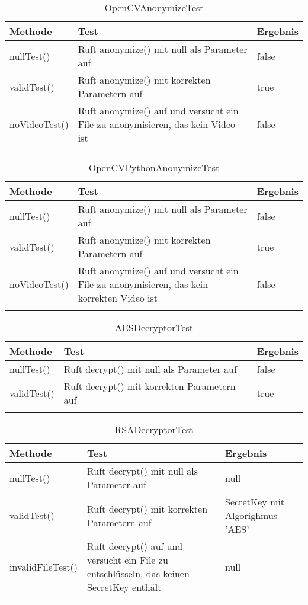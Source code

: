 \begin{longtable}{p{} | p{} | p{}}
\hline
  \textbf{Methode} & \textbf{Test} & \textbf{Ergebnis}\\
  \hline
  nullTest() & Ruft anonymize() mit null als Parameter auf & false\\
  \hline
  validTest() & Ruft anonymize() mit korrekten Parametern auf & true\\
  \hline
  noVideoTest() & Ruft anonymize() auf und versucht ein File zu anonymisieren, das kein Video ist & false\\
  \hline 
  \caption{OpenCVAnonymizeTest}
 \end{longtable}
 
 \begin{longtable}{p{} | p{} | p{}}
\hline
  \textbf{Methode} & \textbf{Test} & \textbf{Ergebnis}\\
  \hline
  nullTest() & Ruft anonymize() mit null als Parameter auf & false\\
  \hline
  validTest() & Ruft anonymize() mit korrekten Parametern auf & true\\
  \hline
  noVideoTest() & Ruft anonymize() auf und versucht ein File zu anonymisieren, das kein korrekten Video ist & false\\
  \hline 
  \caption{OpenCVPythonAnonymizeTest}
 \end{longtable}
 
 \begin{longtable}{p{} | p{} | p{}}
\hline
   \textbf{Methode} & \textbf{Test} & \textbf{Ergebnis}\\
  \hline
  nullTest() & Ruft decrypt() mit null als Parameter auf & false\\
  \hline
  validTest() & Ruft decrypt() mit korrekten Parametern auf & true\\
  \hline 
  \caption{AESDecryptorTest}
 \end{longtable}
 
 \begin{longtable}{p{} | p{} | p{}}
 \hline
 \textbf{Methode} & \textbf{Test} & \textbf{Ergebnis}\\
  \hline
  nullTest() & Ruft decrypt() mit null als Parameter auf & null\\
  \hline
  validTest() & Ruft decrypt() mit korrekten Parametern auf & SecretKey mit Algorighmus 'AES'\\
  \hline 
  invalidFileTest() & Ruft decrypt() auf und versucht ein File zu entschlüsseln, das keinen SecretKey enthält & null\\
  \hline
  \caption{RSADecryptorTest}
 \end{longtable}
 

